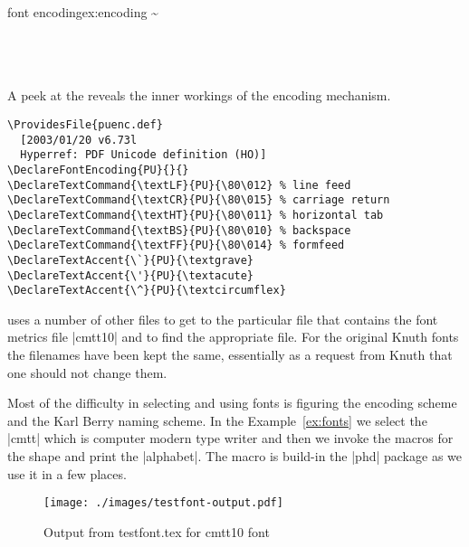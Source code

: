 \begin{texexample}{font encoding}{ex:encoding}
\meaning\textasciitilde\\
\meaning\"\\
\meaning\NG\\
\meaning\k\\
\meaning\alpha
\meaning\printfontparams

\printfontparams
\end{texexample}

A peek at the  reveals the inner workings
of the encoding mechanism.

\begin{verbatim}
\ProvidesFile{puenc.def}
  [2003/01/20 v6.73l
  Hyperref: PDF Unicode definition (HO)]
\DeclareFontEncoding{PU}{}{}
\DeclareTextCommand{\textLF}{PU}{\80\012} % line feed
\DeclareTextCommand{\textCR}{PU}{\80\015} % carriage return
\DeclareTextCommand{\textHT}{PU}{\80\011} % horizontal tab
\DeclareTextCommand{\textBS}{PU}{\80\010} % backspace
\DeclareTextCommand{\textFF}{PU}{\80\014} % formfeed
\DeclareTextAccent{\`}{PU}{\textgrave}
\DeclareTextAccent{\'}{PU}{\textacute}
\DeclareTextAccent{\^}{PU}{\textcircumflex}
\end{verbatim}

\printfontparams 


\latex uses a number of other files to get to the particular file that contains the font metrics file |cmtt10| and to find the appropriate file. For the original Knuth fonts the filenames have been kept the same, essentially as a request from Knuth that one should not change them.

Most of the difficulty in selecting and using fonts is figuring the encoding scheme and the Karl Berry naming scheme. In the Example~\ref{ex:fonts} we select the  |cmtt| which is computer modern type writer and then we invoke the macros for the shape  and print the |alphabet|. The macro \cmd{\alphabet} is build-in the |phd| package as we use it in a few places.

\begin{figure}[htbp]
\centering

\hspace*{-2cm}\texttt{[image: ./images/testfont-output.pdf]}

\caption{Output from testfont.tex for cmtt10 font}
\label{fig:fonttest}
\end{figure}



